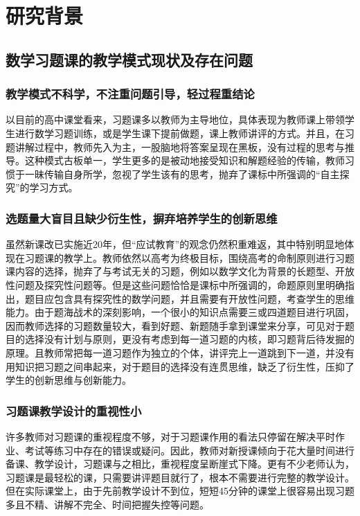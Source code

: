 \chapter{研究背景}


\section{数学习题课的教学模式现状及存在问题}


\subsection{教学模式不科学，不注重问题引导，轻过程重结论}

以目前的高中课堂看来，习题课多以教师为主导地位，具体表现为教师课上带领学生进行数学习题训练，或是学生课下提前做题，课上教师讲评的方式。并且，在习题讲解过程中，教师先入为主，一股脑地将答案呈现在黑板，没有过程的思考与推导。这种模式古板单一，学生更多的是被动地接受知识和解题经验的传输，教师习惯于一昧传输自身所学，忽视了学生该有的思考，抛弃了课标中所强调的“自主探究”的学习方式。


\subsection{选题量大盲目且缺少衍生性，摒弃培养学生的创新思维}

虽然新课改已实施近20年，但“应试教育”的观念仍然积重难返，其中特别明显地体现在习题课的教学上。教师依然以高考为终极目标，围绕高考的命制原则进行习题课内容的选择，抛弃了与考试无关的习题，例如以数学文化为背景的长题型、开放性问题及探究性问题等。但是这些问题恰恰是课标中所强调的，命题原则里明确指出，题目应包含具有探究性的数学问题，并且需要有开放性问题，考查学生的思维能力。由于题海战术的深刻影响，一个很小的知识点需要三或四道题目进行巩固，因而教师选择的习题数量较大，看到好题、新题随手拿到课堂来分享，可见对于题目的选择没有计划与原则，更没有考虑到每一道习题的内核，即习题背后待发掘的原理。且教师常把每一道习题作为独立的个体，讲评完上一道跳到下一道，并没有用知识把习题之间串起来，对于题目的选择没有连贯思维，缺乏了衍生性，压抑了学生的创新思维与创新能力。


\subsection{习题课教学设计的重视性小}

许多教师对习题课的重视程度不够，对于习题课作用的看法只停留在解决平时作业、考试等练习中存在的错误或疑问。因此，教师对新授课倾向于花大量时间进行备课、教学设计，习题课与之相比，重视程度呈断崖式下降。更有不少老师认为，习题课是最轻松的课，只需要讲评题目就行了，根本不需要进行完整的教学设计。但在实际课堂上，由于先前教学设计不到位，短短45分钟的课堂上很容易出现习题多且不精、讲解不完全、时间把握失控等问题。



